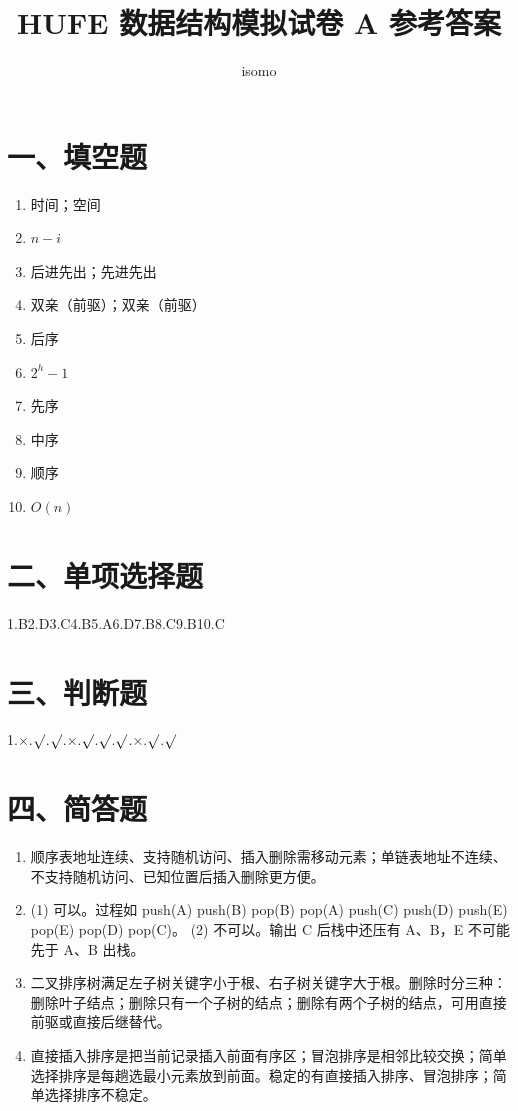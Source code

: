 \documentclass{../../note}
\title{HUFE 数据结构模拟试卷 A 参考答案}
\author{isomo}
\begin{document}
\fontsize{12pt}{14.4pt}\selectfont
\maketitle

\section*{一、填空题}

\begin{enumerate}
\item 时间；空间
\item $n-i$
\item 后进先出；先进先出
\item 双亲（前驱）；双亲（前驱）
\item 后序
\item $2^h-1$
\item 先序
\item 中序
\item 顺序
\item $O(n)$
\end{enumerate}

\section*{二、单项选择题}

1.B\quad 2.D\quad 3.C\quad 4.B\quad 5.A\quad 6.D\quad 7.B\quad 8.C\quad 9.B\quad 10.C

\section*{三、判断题}

1.$\times$.$\surd$.$\surd$.$\times$.$\surd$.$\surd$.$\surd$.$\times$.$\surd$.$\surd$

\section*{四、简答题}

\begin{enumerate}[itemsep=0.8em]
\item 顺序表地址连续、支持随机访问、插入删除需移动元素；单链表地址不连续、不支持随机访问、已知位置后插入删除更方便。
\item (1) 可以。过程如 push(A) push(B) pop(B) pop(A) push(C) push(D) push(E) pop(E) pop(D) pop(C)。\newline
(2) 不可以。输出 C 后栈中还压有 A、B，E 不可能先于 A、B 出栈。
\item 二叉排序树满足左子树关键字小于根、右子树关键字大于根。删除时分三种：删除叶子结点；删除只有一个子树的结点；删除有两个子树的结点，可用直接前驱或直接后继替代。
\item 直接插入排序是把当前记录插入前面有序区；冒泡排序是相邻比较交换；简单选择排序是每趟选最小元素放到前面。稳定的有直接插入排序、冒泡排序；简单选择排序不稳定。
\end{enumerate}
\end{document}
